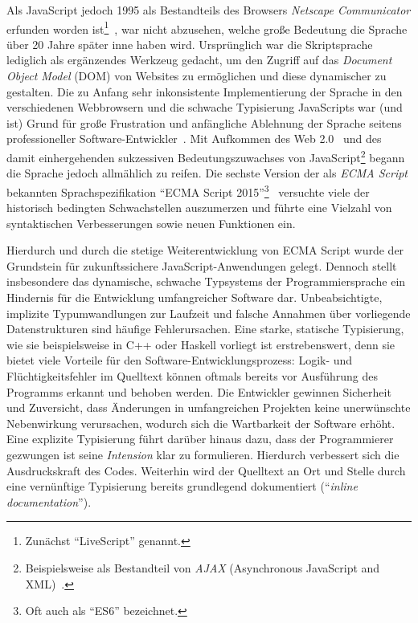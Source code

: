 Als JavaScript jedoch 1995 als Bestandteils des Browsers \emph{Netscape Communicator} erfunden worden ist\footnote{Zunächst \enquote{LiveScript} genannt.}~\autocite{severance:2012:js10days}, war nicht abzusehen, welche große Bedeutung die Sprache über 20 Jahre später inne haben wird. Ursprünglich war die Skriptsprache lediglich als ergänzendes Werkzeug gedacht, um den Zugriff auf das \emph{Document Object Model} (DOM) von Websites zu ermöglichen und diese dynamischer zu gestalten. Die zu Anfang sehr inkonsistente Implementierung der Sprache in den verschiedenen Webbrowsern und die schwache Typisierung JavaScripts war (und ist) Grund für große Frustration und anfängliche Ablehnung der Sprache seitens professioneller Software-Entwickler~\autocite{oreilly:2001:js}.
Mit Aufkommen des Web 2.0~\autocite{oreilly:2005:web20} und des damit einhergehenden sukzessiven Bedeutungszuwachses von JavaScript\footnote{Beispielsweise als Bestandteil von \emph{AJAX} (Asynchronous JavaScript and XML)~\autocite{garret:ajax}.} begann die Sprache jedoch allmählich zu reifen. Die sechste Version der als \emph{ECMA Script} bekannten Sprachspezifikation \enquote{ECMA Script 2015}\footnote{Oft auch als \enquote{ES6} bezeichnet.}~\autocite{ecmascript:2015} versuchte viele der historisch bedingten Schwachstellen auszumerzen und führte eine Vielzahl von syntaktischen Verbesserungen sowie neuen Funktionen ein.

Hierdurch und durch die stetige Weiterentwicklung von ECMA Script wurde der Grundstein für zukunftssichere JavaScript-Anwendungen gelegt. Dennoch stellt insbesondere das dynamische, schwache Typsystems der Programmiersprache ein Hindernis für die Entwicklung umfangreicher Software dar. Unbeabsichtigte, implizite Typumwandlungen zur Laufzeit und falsche Annahmen über vorliegende Datenstrukturen sind häufige Fehlerursachen. Eine starke, statische Typisierung, wie sie beispielsweise in C++ oder Haskell vorliegt ist erstrebenswert, denn sie bietet viele Vorteile für den Software-Entwicklungsprozess: Logik- und Flüchtigkeitsfehler im Quelltext können oftmals bereits vor Ausführung des Programms erkannt und behoben werden. Die Entwickler gewinnen Sicherheit und Zuversicht, dass Änderungen in umfangreichen Projekten keine unerwünschte Nebenwirkung verursachen, wodurch sich die Wartbarkeit der Software erhöht. Eine explizite Typisierung führt darüber hinaus dazu, dass der Programmierer gezwungen ist seine \emph{Intension} klar zu formulieren. Hierdurch verbessert sich die Ausdruckskraft des Codes. Weiterhin wird der Quelltext an Ort und Stelle durch eine vernünftige Typisierung bereits grundlegend dokumentiert (\enquote{\emph{inline documentation}}).

